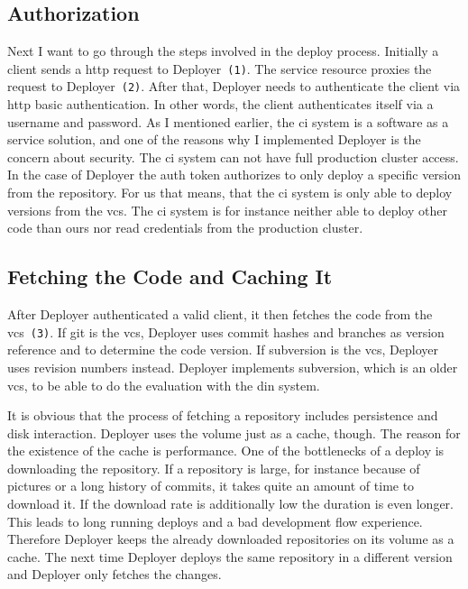 \subsection{Authorization}

Next I want to go through the steps involved in the deploy process. Initially a client
sends a http request to Deployer~\texttt{(1)}. The service resource proxies the request
to Deployer~\texttt{(2)}. After that, Deployer needs to authenticate the client via http
basic authentication. In other words, the client authenticates itself via a username and
password. As I mentioned earlier, the \gls{ci} system is a software as a service solution,
and one of the reasons why I implemented Deployer is the concern about security. The
\gls{ci} system can not have full production cluster access. In the case of Deployer the
auth token authorizes to only deploy a specific version from the repository. For us that
means, that the \gls{ci} system is only able to deploy versions from the \gls{vcs}. The
\gls{ci} system is for instance neither able to deploy other code than ours nor read
credentials from the production cluster.

\subsection{Fetching the Code and Caching It}

After Deployer authenticated a valid client, it then fetches the code from the
\gls{vcs}~\texttt{(3)}. If git is the \gls{vcs}, Deployer uses commit hashes and branches
as version reference and to determine the code version. If subversion is the \gls{vcs},
Deployer uses revision numbers instead. Deployer implements subversion, which is an older \gls{vcs}, to be able to do the evaluation with the \gls{din} system.

It is obvious that the process of fetching a repository includes persistence and disk
interaction. Deployer uses the volume just as a cache, though. The reason for the existence
of the cache is performance. One of the bottlenecks of a deploy is downloading the
repository. If a repository is large, for instance because of pictures or a long history
of commits, it takes quite an amount of time to download it. If the download rate is
additionally low the duration is even longer. This leads to long running deploys and a bad
development flow experience. Therefore Deployer keeps the already downloaded repositories
on its volume as a cache. The next time Deployer deploys the same repository in a
different version and Deployer only fetches the changes.

